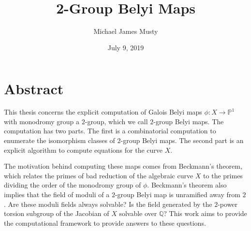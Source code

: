 \documentclass{dcthesis}
\title{2-Group Belyi Maps}
\author{Michael James Musty}
\date{July 9, 2019}
\newcommand{\PP}{\mathbb P}
\newcommand{\QQ}{\mathbb Q}
\newcommand{\mm}[1]{{\color{blue} \sf MM: [#1]}}
\numberwithin{equation}{section}
\theoremstyle{definition}
\theoremstyle{remark}
\begin{document}
\frontmatter

\maketitle

\chapter*{Abstract}
This thesis concerns the explicit computation
of Galois Belyi maps
$\phi\colon X\to\PP^1$
with monodromy group
a $2$-group,
which we call $2$-group Belyi maps.
The computation has two parts.
The first is a combinatorial computation
to enumerate the isomorphism classes
of $2$-group Belyi maps.
The second part is an explicit algorithm
to compute equations for the curve
$X$.
\par
The motivation behind computing these maps comes from Beckmann's theorem,
which relates the primes of bad reduction of the algebraic curve
$X$ to the primes dividing the order of the monodromy group of $\phi$.
Beckmann's theorem also implies that the field of
moduli of a $2$-group Belyi map is unramified away from $2$.
Are these moduli fields always solvable?
Is the field generated by the $2$-power torsion
subgroup of the Jacobian of $X$ solvable over $\QQ$?
This work aims to provide the computational framework
to provide answers to these questions.

\end{document}
